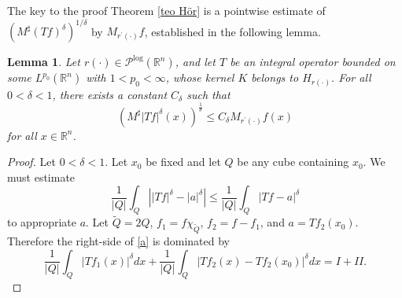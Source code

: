\documentclass[a4paper,11pt,reqno]{amsart}
\theoremstyle{plain}
\numberwithin{equation}{section}
\newtheorem{lema}[teo]{Lemma}
\theoremstyle{definition}
\newcommand{\R}{{\mathbb{R}^n}}
\begin{document}
The key to the proof Theorem \ref{teo Hör} is a pointwise estimate of $(M^\sharp(Tf)^\delta)^{1/\delta}$ by $M_{r^\prime(\cdot)}f$, established in the following lemma.


\begin{lema} \label{acotación puntal del maximal sharp del operador} Let $r(\cdot)\in\mathcal{P}^{\log}(\R)$, and let $T$ be an integral operator bounded on some $L^{p_0}(\R)$ with $1<p_0<\infty$, whose kernel $K$ belongs to $H_{r(\cdot)}$. For all $0<\delta<1$, there exists a constant $C_\delta$ such that
	\begin{equation*}
	\left(M^\sharp\left|Tf\right|^\delta(x)\right)^\frac{1}{\delta}\leq C_\delta M_{r^\prime(\cdot)}f(x)
	\end{equation*}
	for all $x\in\R$.
\end{lema}
\begin{proof} Let $0<\delta<1$. Let $x_0$ be fixed and let $Q$ be any cube containing $x_0$. We must estimate
	\begin{equation}\label{a}
	\frac{1}{|Q|}\int_{Q}\left||Tf|^\delta - |a|^\delta \right|\leq\frac{1}{|Q|}\int_{Q}|Tf-a|^\delta
	\end{equation}
	to appropriate $a$.	Let ${\tilde{Q}}=2Q$, $f_1=f\chi_{\tilde{Q}}$, $f_2=f-f_1$, and $a=Tf_2(x_0)$. Therefore the right-side of \eqref{a} is dominated by
	\begin{equation*}
	\frac{1}{|Q|}\int_{Q}|Tf_1(x)|^\delta dx+\frac{1}{|Q|}\int_{Q}|Tf_2(x)-Tf_2(x_0)|^\delta dx=I+II.
	\end{equation*}
	

\end{proof}
\end{document}
